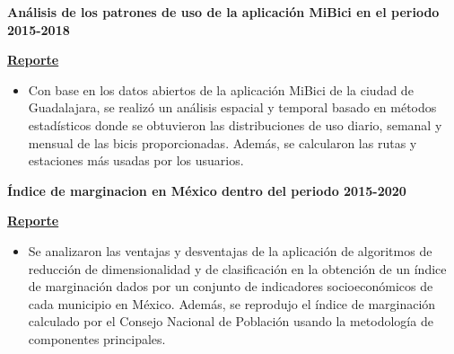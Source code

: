 \documentclass[a3paper]{adcv_color}
\newcommand{\proyect}[5]{\begin{minipage}{1\linewidth}
		\begin{minipage}{1\linewidth}
			\textbf{#1}
		\end{minipage}
	\end{minipage}
	\href{#4}{\textbf{#5}}
	\vspace{-1cm}\\
}
\begin{document}
\proyect{Análisis de los patrones de uso de la aplicación MiBici en el periodo 2015-2018}{Noviembre 2021}{-0.2}{https://raw.githubusercontent.com/giovannilopez9808/MiBici/main/Document/Main.pdf}{Reporte}
\begin{itemize}
	\item  Con base en los datos abiertos de la aplicación MiBici de la ciudad de Guadalajara, se realizó un análisis espacial y temporal basado en métodos estadísticos donde se obtuvieron las distribuciones de uso diario, semanal y mensual de las bicis proporcionadas. Además, se calcularon las rutas y estaciones más usadas por los usuarios.
\end{itemize}
\proyect{Índice de marginacion en México dentro del periodo 2015-2020}{Octubre 2021}{-0.2}{https://raw.githubusercontent.com/giovannilopez9808/IndiceDeMarginacion2015_2020/main/Document/Main.pdf}{Reporte}
\begin{itemize}
	\item Se analizaron las ventajas y desventajas de la aplicación de algoritmos de reducción de dimensionalidad y de clasificación en la obtención de un índice de marginación dados por un conjunto de indicadores socioeconómicos de cada municipio en México. Además, se reprodujo el índice de marginación calculado por el Consejo Nacional de Población usando la metodología de componentes principales.
\end{itemize}
\end{document}
